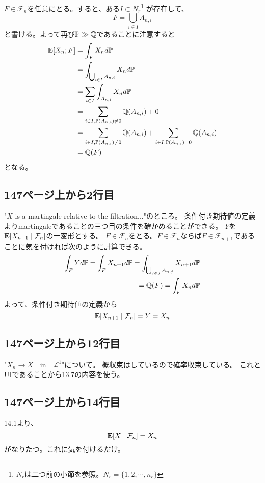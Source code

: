     $F \in \mathcal{F}_n$を任意にとる。すると、ある$I \subset N_r$\footnote{$N_r$は二つ前の小節を参照。$N_r = \{ 1, 2, \cdots,n_r \}$}
    が存在して、
    \[
      F = \bigcup_{i \in I}A_{n,i}
    \]
    と書ける。よって再び${\mathbb{P}} \gg \mathbb{Q}$であることに注意すると
    \begin{align*}
      {\mathbf{E}}[X_n;F] &= \int_F X_n d{\mathbb{P}} \\
      &= \int_{\bigcup_{i \in I}A_{n,i}} X_n d{\mathbb{P}}\\
      &= \sum_{i\in I}\int_{A_{n,i}}X_n d{\mathbb{P}}\\
      &= \sum_{i\in I, {\mathbb{P}}(A_{n,i})\neq0}\mathbb{Q}(A_{n,i}) + 0\\
      &= \sum_{i\in I, {\mathbb{P}}(A_{n,i})\neq0}\mathbb{Q}(A_{n,i}) + \sum_{i\in I, {\mathbb{P}}(A_{n,i})=0}\mathbb{Q}(A_{n,i})\\
      &=\mathbb{Q}(F)
    \end{align*}
    となる。

  \subsection{147ページ上から2行目}
    "$X$ is a martingale relative to the filtration..."のところ。
    条件付き期待値の定義よりmartingaleであることの三つ目の条件を確かめることができる。
    $Y$を${\mathbf{E}}[X_{n+1} \mid \mathcal{F}_{n}]$の一変形とする。
    $F \in \mathcal{F}_n$をとる。$F \in \mathcal{F}_n$ならば$F \in \mathcal{F}_{n+1}$であることに気を付ければ次のように計算できる。
    \begin{align*}
      \int_F Y d{\mathbb{P}} = \int_F X_{n+1} d{\mathbb{P}} = \int_{\bigcup_{j \in J}A_{n,j}}X_{n+1}d{\mathbb{P}}\\
      = \mathbb{Q}(F) = \int_F X_n d{\mathbb{P}}
    \end{align*}
    よって、条件付き期待値の定義から
    \[
      {\mathbf{E}}[X_{n+1} \mid \mathcal{F}_{n}] = Y = X_n
    \]

  \subsection{147ページ上から12行目}
    "$X_n \longrightarrow X \quad \text{in} \quad\mathcal{L}^1$"について。
    概収束はしているので確率収束している。
    これとUIであることから13.7の内容を使う。

  \subsection{147ページ上から14行目}
    14.1より、
    \[
      {\mathbf{E}}[X \mid \mathcal{F}_n] = X_n
    \]
    がなりたつ。これに気を付けるだけ。

